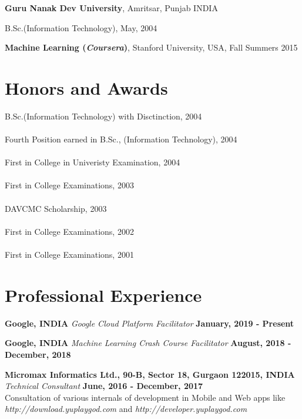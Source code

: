 \documentclass[margin,line]{res}
\newenvironment{list1}{
  \begin{list}{\ding{113}}{%
      \setlength{\itemsep}{0in}
      \setlength{\parsep}{0in} \setlength{\parskip}{0in}
      \setlength{\topsep}{0in} \setlength{\partopsep}{0in}
      \setlength{\leftmargin}{0.17in}}}{\end{list}}
\begin{document}
\begin{resume}
{\bf Guru Nanak Dev University}, Amritsar, Punjab INDIA\\
\vspace*{-.1in}
\begin{list1}
\item[] B.Sc.(Information Technology),  May, 2004
\end{list1}

{\bf Machine Learning (\textit{Coursera})}, Stanford University, USA, Fall Summers 2015\\
\vspace*{-.1in}

\section{\sc Honors and Awards}
B.Sc.(Information Technology) with Disctinction, 2004\\\\
Fourth Position earned in B.Sc., (Information Technology), 2004\\\\
First in College in Univeristy Examination, 2004\\\\
First in College Examinations, 2003\\\\
DAVCMC Scholarship, 2003\\\\
First in College Examinations, 2002\\\\
First in College Examinations, 2001\\

\section{\sc Professional Experience}

%
%

{\bf Google, INDIA}
{\em Google Cloud Platform Facilitator} \hfill {\bf January, 2019 - Present}

{\bf Google, INDIA}
{\em Machine Learning Crash Course Facilitator} \hfill {\bf August, 2018 - December, 2018}

{\bf Micromax Informatics Ltd., 90-B, Sector 18, Gurgaon 122015, INDIA}
{\em Technical Consultant} \hfill {\bf June, 2016 - December, 2017}\\
Consultation of various internals of development in Mobile and Web apps like {\em http://download.yuplaygod.com} and {\em http://developer.yuplaygod.com}


\end{resume}
\end{document}
